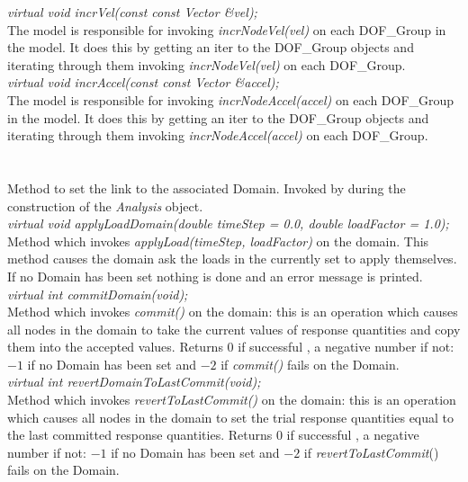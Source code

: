 {\em virtual void incrVel(const const Vector \&vel);} \\
The model is responsible for invoking {\em incrNodeVel(vel)} on each
DOF\_Group in the model. It does this by getting an iter to the
DOF\_Group objects and iterating through them invoking {\em
incrNodeVel(vel)} on each DOF\_Group. \\


{\em virtual void incrAccel(const const Vector \&accel);} \\
The model is responsible for invoking {\em incrNodeAccel(accel)} on each
DOF\_Group in the model. It does this by getting an iter to the
DOF\_Group objects and iterating through them invoking {\em
incrNodeAccel(accel)} on each DOF\_Group. \\



  \\
 \\
Method to set the link to the associated Domain. Invoked by
during the construction of the {\em Analysis} object.\\

{\em virtual void applyLoadDomain(double timeStep = 0.0, double
loadFactor = 1.0);}\\
Method which invokes {\em applyLoad(timeStep, loadFactor)} on the
domain. This method causes the domain ask the loads in the currently
set to apply themselves. If no Domain has been set nothing is done and an error
message is printed. \\ 


{\em virtual int commitDomain(void);} \\
Method which invokes {\em commit()} on the domain: this is an
operation which causes all nodes in the domain to take the current
values of response quantities and copy them into the accepted values. 
Returns $0$ if successful , a negative number if not: $-1$ if no
Domain has been set and $-2$ if {\em commit()} fails on the Domain.\\

{\em virtual int revertDomainToLastCommit(void);} \\
Method which invokes {\em revertToLastCommit()} on the domain: this is an
operation which causes all nodes in the domain to set the trial
response quantities equal to the last committed response quantities.
Returns $0$ if successful , a negative number if not: $-1$ if no
Domain has been set and $-2$ if {\em revertToLastCommit}() fails on
the Domain.\\ 

